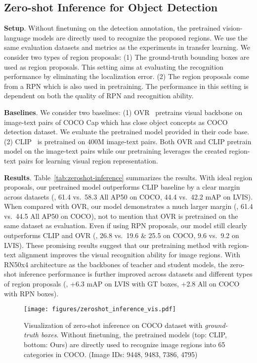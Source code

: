 \subsection{Zero-shot Inference for Object Detection}

\noindent \textbf{Setup}. 
Without finetuning on the detection annotation, the pretrained vision-language models are directly used to recognize the proposed regions. We use the same evaluation datasets and metrics as the experiments in transfer learning. We consider two types of region proposals: (1) The ground-truth bounding boxes are used as region proposals. This setting aims at evaluating the recognition performance by eliminating the localization error. (2) The region proposals come from a RPN which is also used in pretraining. The performance in this setting is dependent on both the quality of RPN and recognition ability.

\smallskip
\noindent \textbf{Baselines}. We consider two baselines: (1) OVR~\cite{zareian2021open} pretrains visual backbone on image-text pairs of COCO Cap which has close object concepts as COCO detection dataset. We evaluate the pretrained model provided in their code base.  (2) CLIP~\cite{radford2021learning} is pretrained on 400M image-text pairs. Both OVR and CLIP pretrain model on the image-text pairs while our pretraining leverages the created region-text pairs for learning visual region representation. 

\smallskip
\noindent \textbf{Results}. Table~\ref{tab:zeroshot-inference} summarizes the results. With ideal region proposals, our pretrained model outperforms CLIP baseline by a clear margin across datasets (\eg, 61.4 vs.\ 58.3 All AP50 on COCO, 44.4 vs.\ 42.2 mAP on LVIS). When compared with OVR, our model demonstrates a much larger margin (\eg, 61.4 vs.\ 44.5 All AP50 on COCO), not to mention that OVR is pretrained on the same dataset as evaluation. Even if using RPN proposals, our model still clearly outperforms CLIP and OVR (\eg, 26.8 vs.\ 19.6 \& 25.5 on COCO, 9.6 vs.\ 9.2 on LVIS). These promising results suggest that our pretraining method with region-text alignment improves the visual recognition ability for image regions. 
With RN50x4 architecture as the backbones of teacher and student models, the zero-shot inference performance is further improved across datasets and different types of region proposals (\eg, +6.3 mAP on LVIS with GT boxes, +2.8 All on COCO with RPN boxes). 


\begin{figure*}
	\centering
	\texttt{[image: figures/zeroshot\_inference\_vis.pdf]} \vspace{-2mm}
    \caption{Visualization of zero-shot inference on COCO dataset with {\it ground-truth boxes}. Without finetuning, the pretrained models (top: CLIP, bottom: Ours) are directly used to recognize image regions into 65 categories in COCO. (Image IDs: 9448, 9483, 7386, 4795)} \vspace{+2mm}
    \label{fig:visualization}
\end{figure*}


